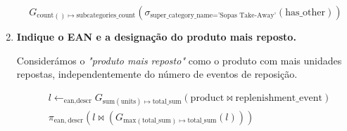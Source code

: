 \documentclass[12pt,a4paper]{article}
\newcommand{\op}{\text}
\begin{document}
\begin{enumerate}
    \[
      G_{\op{count}()\mapsto \op{subcategories\_count}}\left(\sigma_{\op{super\_category\_name}=\text{'Sopas Take-Away'}}(\op{has\_other})\right)
    \]

    

    \item \textbf{Indique o EAN e a designação do produto mais reposto.}
      
    Considerámos o \textit{"produto mais reposto"} como o produto com mais unidades repostas, independentemente do número de eventos de reposição.

    \[
      \begin{aligned}
        &l \leftarrow _{\op{ean,descr}} G_{\op{sum}(\op{units})\mapsto \op{total\_sum}}(\op{product} \bowtie \op{replenishment\_event})\\
        &\pi_{\op{ean},~\op{descr}}\left(
          l \bowtie \left( G_{\op{max}(\op{total\_sum})\mapsto \op{total\_sum}}(l)\right)
        \right)
        \end{aligned}
    \]

    
  \end{enumerate}
  
\end{document}
